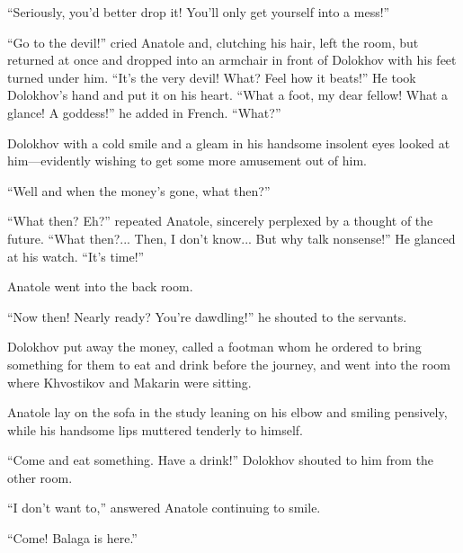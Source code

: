``Seriously, you'd better drop it! You'll only get yourself into
a mess!''

``Go to the devil!'' cried Anatole and, clutching his hair, left
the room, but returned at once and dropped into an armchair in
front of Dolokhov with his feet turned under him. ``It's the very
devil! What? Feel how it beats!'' He took Dolokhov's hand and put
it on his heart. ``What a foot, my dear fellow! What a glance! A
goddess!'' he added in French. ``What?''

Dolokhov with a cold smile and a gleam in his handsome insolent
eyes looked at him---evidently wishing to get some more amusement
out of him.

``Well and when the money's gone, what then?''

``What then? Eh?'' repeated Anatole, sincerely perplexed by a
thought of the future. ``What then?... Then, I don't know... But
why talk nonsense!'' He glanced at his watch. ``It's time!''

Anatole went into the back room.

``Now then! Nearly ready? You're dawdling!'' he shouted to the
servants.

Dolokhov put away the money, called a footman whom he ordered to
bring something for them to eat and drink before the journey, and
went into the room where Khvostikov and Makarin were sitting.

Anatole lay on the sofa in the study leaning on his elbow and
smiling pensively, while his handsome lips muttered tenderly to
himself.

``Come and eat something. Have a drink!'' Dolokhov shouted to him
from the other room.

``I don't want to,'' answered Anatole continuing to smile.

``Come! Balaga is here.''


